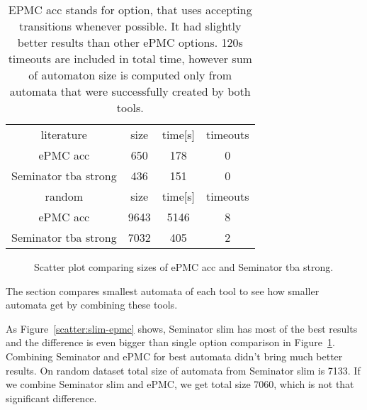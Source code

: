 \documentclass[
	digital,
nolof, nolot
]{fithesis3}
\newcommand{\hlineny}{\hline}
\begin{document}
	\begin{table}[ht]
		\centering
		
		\caption{EPMC acc stands for option, that uses accepting transitions whenever possible. It had slightly better results than other ePMC options. 120s timeouts are included in total time, however sum of automaton size is computed only from automata that were successfully created by both tools. }
		\label{table:epmc-seminator-1}
		\begin{tabular}{ |c||c|c|c| } 
			\hline
			literature&size&time[s]&timeouts\\
			\hhline{|====|}
			ePMC acc&650 &178&0 \\
			\hline
			Seminator tba strong &436 &151&0 \\
			\hlineny
			\hline
			random&size&time[s]&timeouts\\
			\hhline{|====|}
			ePMC acc&9643 & 5146&8\\
			\hline
			Seminator tba strong &7032 &405&2 \\
			\hlineny
		\end{tabular}
	\end{table}
	\begin{figure}[ht]
		\centering
		
		\caption{Scatter plot comparing sizes of ePMC acc and Seminator tba strong.}
		\label{scatter:slim-epmc-1}
		\begin{tikzpicture}
			
		\end{tikzpicture}
	\end{figure}
	
	
		The section compares smallest automata of each tool to see how smaller automata get by combining these tools.
		
		As Figure~\ref{scatter:slim-epmc} shows, Seminator slim has most of the best results and the difference is even bigger than single option comparison in Figure~\ref{scatter:slim-epmc-1}. Combining Seminator and ePMC for best automata didn't bring much better results. On random dataset total size of automata from Seminator slim is 7133. If we combine Seminator slim and ePMC, we get total size 7060, which is not that significant difference.
	
\end{document}
